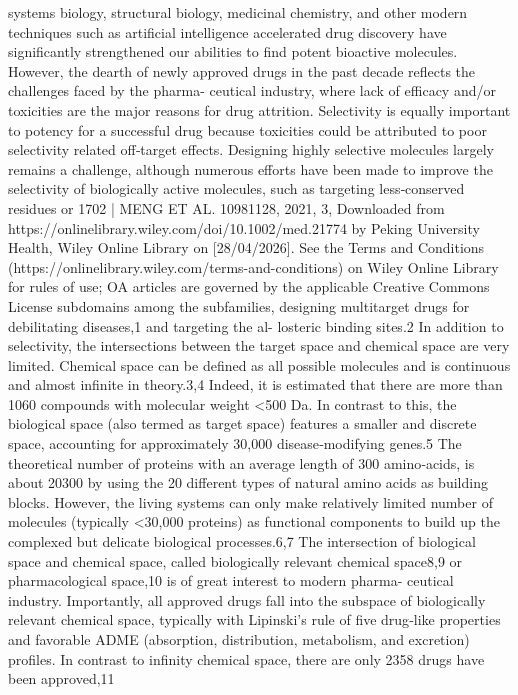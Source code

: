 systems biology, structural biology, medicinal chemistry, and other modern techniques such as artificial intelligence
accelerated drug discovery have significantly strengthened our abilities to find potent bioactive molecules.
However, the dearth of newly approved drugs in the past decade reflects the challenges faced by the pharma-
ceutical industry, where lack of efficacy and/or toxicities are the major reasons for drug attrition. Selectivity is
equally important to potency for a successful drug because toxicities could be attributed to poor selectivity related
off‐target effects. Designing highly selective molecules largely remains a challenge, although numerous efforts have
been made to improve the selectivity of biologically active molecules, such as targeting less‐conserved residues or
1702 |
MENG ET AL.
 10981128, 2021, 3, Downloaded from https://onlinelibrary.wiley.com/doi/10.1002/med.21774 by Peking University Health, Wiley Online Library on [28/04/2026]. See the Terms and Conditions (https://onlinelibrary.wiley.com/terms-and-conditions) on Wiley Online Library for rules of use; OA articles are governed by the applicable Creative Commons License
subdomains among the subfamilies, designing multitarget drugs for debilitating diseases,1 and targeting the al-
losteric binding sites.2
In addition to selectivity, the intersections between the target space and chemical space are very limited.
Chemical space can be defined as all possible molecules and is continuous and almost infinite in theory.3,4 Indeed, it
is estimated that there are more than 1060 compounds with molecular weight <500 Da. In contrast to this, the
biological space (also termed as target space) features a smaller and discrete space, accounting for approximately
30,000 disease‐modifying genes.5 The theoretical number of proteins with an average length of 300 amino‐acids, is
about 20300 by using the 20 different types of natural amino acids as building blocks. However, the living systems
can only make relatively limited number of molecules (typically <30,000 proteins) as functional components to
build up the complexed but delicate biological processes.6,7 The intersection of biological space and chemical space,
called biologically relevant chemical space8,9 or pharmacological space,10 is of great interest to modern pharma-
ceutical industry. Importantly, all approved drugs fall into the subspace of biologically relevant chemical space,
typically with Lipinski's rule of five drug‐like properties and favorable ADME (absorption, distribution, metabolism,
and excretion) profiles. In contrast to infinity chemical space, there are only 2358 drugs have been approved,11
